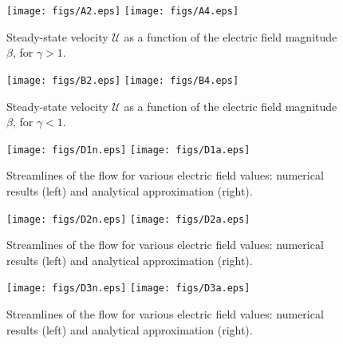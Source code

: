 \documentclass[final]{elsarticle}
\newcommand\cU{\mathscr{U}}
\begin{document}
\begin{figure}[htbp]
    \begin{center}
        \texttt{[image: figs/A2.eps]}
        \texttt{[image: figs/A4.eps]}
        \caption{Steady-state velocity $\cU$ as a function of the electric field magnitude $\beta$, 
        for $\gamma > 1$.}
        \label{fig:NumResA}
    \end{center}
\end{figure}
\begin{figure}[htbp]
    \begin{center}
        \texttt{[image: figs/B2.eps]}
        \texttt{[image: figs/B4.eps]}
        \caption{Steady-state velocity $\cU$ as a function of the electric field magnitude $\beta$,
        for $\gamma < 1$.}
        \label{fig:NumResB}
    \end{center}
\end{figure}
\begin{figure}[htbp]
    \begin{center}
        \texttt{[image: figs/D1n.eps]}
        \texttt{[image: figs/D1a.eps]}
        \caption{Streamlines of the flow for various electric field values: numerical results (left)
        and analytical approximation (right).}
        \label{fig:NumResC}
    \end{center}
\end{figure}
\begin{figure}[htbp]
    \begin{center}
        \texttt{[image: figs/D2n.eps]}
        \texttt{[image: figs/D2a.eps]}
        \caption{Streamlines of the flow for various electric field values: numerical results (left)
        and analytical approximation (right).}
        \label{fig:NumResD}
    \end{center}
\end{figure}
\begin{figure}[htbp]
    \begin{center}
        \texttt{[image: figs/D3n.eps]}
        \texttt{[image: figs/D3a.eps]}
        \caption{Streamlines of the flow for various electric field values: numerical results (left)
        and analytical approximation (right).}
        \label{fig:NumResE}
    \end{center}
\end{figure}
\end{document}
